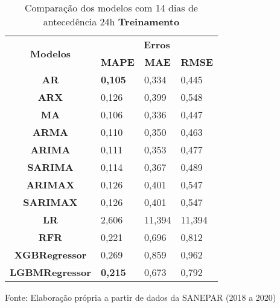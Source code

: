\begin{table}[H]
	\centering
	\caption{Comparação dos modelos com 14 dias de antecedência 24h \textbf{Treinamento} }\label{tb:30-24trn}
	\begin{tabular}{@{}clll@{}}
		\toprule
		\multirow{2}{*}{\textbf{Modelos}} & \multicolumn{3}{c}{\textbf{Erros}}                                                                       \\ \cmidrule(l){2-4} 
		& \multicolumn{1}{c}{\textbf{MAPE}} & \multicolumn{1}{c}{\textbf{MAE}} & \multicolumn{1}{c}{\textbf{RMSE}} \\ \hline
\textbf{AR}                       &\textbf{ 0,105}                             & 0,334                            & 0,445                             \\
\textbf{ARX}                      & 0,126                             & 0,399                            & 0,548                             \\
\textbf{MA}                       & 0,106                             & 0,336                            & 0,447                             \\
\textbf{ARMA}                     & 0,110                             & 0,350                            & 0,463                             \\
\textbf{ARIMA}                    & 0,111                             & 0,353                            & 0,477                             \\
\textbf{SARIMA}                   & 0,114                             & 0,367                            & 0,489                             \\
\textbf{ARIMAX}                   & 0,126                             & 0,401                            & 0,547                             \\
\textbf{SARIMAX}                  & 0,126                             & 0,401                            & 0,547                             \\
\textbf{LR}                       & 2,606                             & 11,394                           & 11,394                            \\
\textbf{RFR}                      & 0,221                             & 0,696                            & 0,812                             \\
\textbf{XGBRegressor}             & 0,269                             & 0,859                            & 0,962                             \\
\textbf{LGBMRegressor}            & \textbf{0,215}                             & 0,673                            & 0,792                             \\ \bottomrule
	\end{tabular}

Fonte: Elaboração própria a partir de dados da SANEPAR (2018 a 2020)
\end{table}

